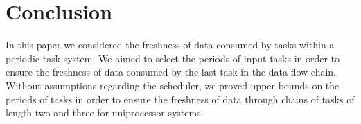 \section{Conclusion}

In this paper we considered the freshness of data consumed by tasks within a periodic task system. We aimed to select the periods of input tasks in order to ensure the freshness of data consumed by the last task in the data flow chain. Without assumptions regarding the scheduler, we proved upper bounds on the periods of tasks in order to ensure the freshness of data through chains of tasks of length two and three for uniprocessor systems.
